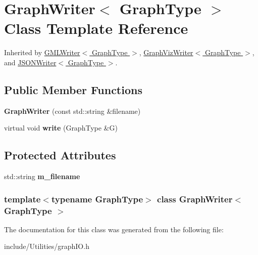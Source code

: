\hypertarget{class_graph_writer}{
\section{GraphWriter$<$ GraphType $>$ Class Template Reference}
\label{class_graph_writer}
}


Inherited by \hyperlink{class_g_m_l_writer}{GMLWriter$<$ GraphType $>$}, \hyperlink{class_graph_viz_writer}{GraphVizWriter$<$ GraphType $>$}, and \hyperlink{class_j_s_o_n_writer}{JSONWriter$<$ GraphType $>$}.

\subsection*{Public Member Functions}
\begin{DoxyCompactItemize}
\item 
\hypertarget{class_graph_writer_af56536ae2b8bc0c5bb0bcaea480690cd}{
{\bfseries GraphWriter} (const std::string \&filename)}
\label{class_graph_writer_af56536ae2b8bc0c5bb0bcaea480690cd}

\item 
\hypertarget{class_graph_writer_a10ae78b5e3eb54b3f073ead5b91a8bb5}{
virtual void {\bfseries write} (GraphType \&G)}
\label{class_graph_writer_a10ae78b5e3eb54b3f073ead5b91a8bb5}

\end{DoxyCompactItemize}
\subsection*{Protected Attributes}
\begin{DoxyCompactItemize}
\item 
\hypertarget{class_graph_writer_a270d6c41c65a92cb9246f8bff7ff2559}{
std::string {\bfseries m\_\-filename}}
\label{class_graph_writer_a270d6c41c65a92cb9246f8bff7ff2559}

\end{DoxyCompactItemize}
\subsubsection*{template$<$typename GraphType$>$ class GraphWriter$<$ GraphType $>$}



The documentation for this class was generated from the following file:\begin{DoxyCompactItemize}
\item 
include/Utilities/graphIO.h\end{DoxyCompactItemize}
